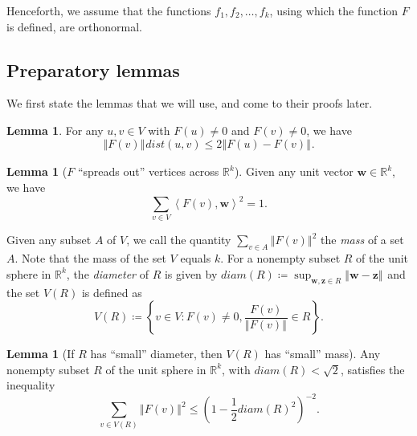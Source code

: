 \documentclass[12pt,a4paper,bold]{thesis}
\theoremstyle{definition}
\newtheorem{lemma}[thm]{Lemma}
\newcommand*{\ip}[2]{\left\langle #1 , #2 \right\rangle}
\newcommand*{\norm}[2][]{\left\Vert #2 \right\Vert_{#1}}
\begin{document}
Henceforth, we assume that the functions $f_1, f_2, \dots, f_k$,
using which the function $F$ is defined, are orthonormal.

\subsection{Preparatory lemmas}

We first state the lemmas that we will use, and come to their proofs later.

\begin{lemma} \label{lem:normFdist}
    For any $u, v \in V$ with $F(u) \neq 0$ and $F(v) \neq 0$, we have
    \begin{equation*}
        \norm{F(v)} dist(u,v) \leq 2 \norm{F(u) - F(v)}.
    \end{equation*}
\end{lemma}

\begin{lemma}[$F$ ``spreads out'' vertices across $\mathbb{R}^k$] \label{lem:spreadingF}
    Given any unit vector $\mathbf{w} \in \mathbb{R}^k$, we have
    \begin{equation*}
        \sum_{v \in V} \ip{F(v)}{\mathbf{w}}^2 = 1.
    \end{equation*}  
\end{lemma}

Given any subset $A$ of $V$, we call the quantity $\sum_{v \in A} \norm{F(v)}^2$
the \emph{mass} of a set $A$. Note that the mass of the set $V$ equals  $k$. 
For a nonempty subset $R$ of the unit sphere in $\mathbb{R}^k$, the \emph{diameter}
of $R$ is given by $diam(R) \coloneq \sup_{\mathbf{w}, \mathbf{z} \in R} 
\norm{\mathbf{w} - \mathbf{z}}$ and the set $V(R)$ is defined as
\begin{equation*}
    V(R) \coloneq \left\{ v \in V : F(v) \neq 0, \frac{F(v)}{\norm{F(v)}} \in R\right\}.
\end{equation*}

\begin{lemma}[If $R$ has ``small'' diameter, then $V(R)$ has ``small'' mass]
\label{lem:smallR-smallVR}
    Any nonempty subset $R$ of the unit sphere in $\mathbb{R}^k$, with $diam(R) < \sqrt{2}$,
    satisfies the inequality
    \begin{equation*}
        \sum_{v \in V(R)} \norm{F(v)}^2 \leq \left(1 - \frac{1}{2} diam(R)^2\right)^{-2}.        
    \end{equation*} 
\end{lemma}
\end{document}

